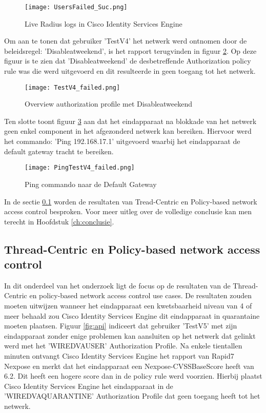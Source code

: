 \begin{figure}[H]
	\centering
	\texttt{[image: UsersFailed\_Suc.png]}
	\caption{Live Radius logs in Cisco Identity Services Engine }
	\label{fig:failed}
\end{figure}

Om aan te tonen dat gebruiker 'TestV4' het netwerk werd ontnomen door de beleidsregel: 'Disable\textunderscore at\textunderscore weekend', is het rapport terugvinden in figuur \ref{fig:failed2}. Op deze figuur is te zien dat 'Disable\textunderscore at\textunderscore weekend' de desbetreffende Authorization policy rule was die werd uitgevoerd en dit resulteerde in geen toegang tot het netwerk. 

\begin{figure}[H]
	\centering
	\texttt{[image: TestV4\_failed.png]}
	\caption{Overview authorization profile met Disable\textunderscore at\textunderscore weekend}
	\label{fig:failed2}
\end{figure}

Ten slotte toont figuur \ref{fig:ping} aan dat het eindapparaat na blokkade van het netwerk geen enkel component in het afgezonderd netwerk kan bereiken. Hiervoor werd het commando: 'Ping 192.168.17.1' uitgevoerd waarbij het eindapparaat de default gateway tracht te bereiken.

\begin{figure}[H]
	\centering
	\texttt{[image: PingTestV4\_failed.png]}
	\caption{Ping commando naar de Default Gateway}
	\label{fig:ping}
\end{figure}

In de sectie \ref{sec:trepo} worden de resultaten van Tread-Centric en Policy-based network access control besproken. Voor meer uitleg over de volledige conclusie kan men terecht in Hoofdstuk \ref{ch:conclusie}.


\subsection{Thread-Centric en Policy-based network access control}
\label{sec:trepo}
In dit onderdeel van het onderzoek ligt de focus op de resultaten van de Thread-Centric en policy-based network access control use cases. De resultaten zouden moeten uitwijzen wanneer het eindapparaat een kwetsbaarheid niveau van 4 of meer behaald zou Cisco Identity Services Engine dit eindapparaat in quarantaine moeten plaatsen.
\newline
\newline
Figuur \ref{fig:api} indiceert dat gebruiker 'TestV5' met zijn eindapparaat zonder enige problemen kan aansluiten op het netwerk dat gelinkt werd met het 'WIRED\textunderscore VA\textunderscore USER' Authorization Profile. Na enkele tientallen minuten ontvangt Cisco Identity Services Engine het rapport van Rapid7 Nexpose en merkt dat het eindapparaat een Nexpose-CVSS\textunderscore Base\textunderscore Score heeft van 6.2. Dit heeft een hogere score dan in de policy rule werd voorzien. Hierbij plaatst Cisco Identity Services Engine het eindapparaat in de 'WIRED\textunderscore VA\textunderscore QUARANTINE' Authorization Profile dat geen toegang heeft tot het netwerk. 

